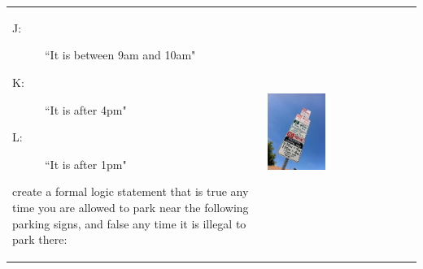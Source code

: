 \documentclass{article}
\begin{document}
\begin{enumerate}
\begin{tabular}{p{}p{}}
\begin{description}
	\item[J:] ``It is between 9am and 10am"
	\item[K:] ``It is after 4pm"
	\item[L:] ``It is after 1pm"
	\end{description}
	create a formal logic statement that is true any time you are allowed to park near the following parking signs, and false any time it is illegal to park there:&
	\begin{center}
	\includegraphics[width=0.4\textwidth,clip,trim=5cm 5cm 5cm 6cm]{Formal-Logic-Exercise-parkingSigns.JPG}
	\end{center}
	\end{tabular}
\end{enumerate}
\hrulefill\\
\label{end}
\end{document}
